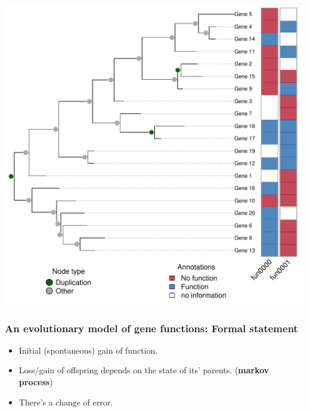 \documentclass[aspectratio=169, 10pt]{beamer}\usepackage[]{graphicx}\usepackage[]{color}
\newenvironment{knitrout}{}{} %
\begin{document}
\begin{frame}

\begin{knitrout}
\color{fgcolor}

{\centering \includegraphics[width=.6\linewidth]{figure/random-tree-1} 

}



\end{knitrout}


\end{frame}



\begin{frame}[label=aphylographicalview]
\frametitle{An evolutionary model of gene functions: Formal statement}


\small

\begin{minipage}{.38\linewidth}
\begin{itemize}
	\item<2-> \textcolor{rootnode}{Initial (spontaneous) gain of function}.
	\item<3-> \textcolor{innernode}{Loss/gain of offspring depends on the state of its' parents. ({\bf markov process})}
	\item<4-> \textcolor{leafnode}{There's a change of error.}
\end{itemize}
\end{minipage}
%
\begin{minipage}{.60\linewidth}
\begin{figure}
	\footnotesize
	\centering
	\def\svgwidth{.8\linewidth}
	
\end{figure}
\end{minipage}


\normalsize

\end{frame}
\end{document}
